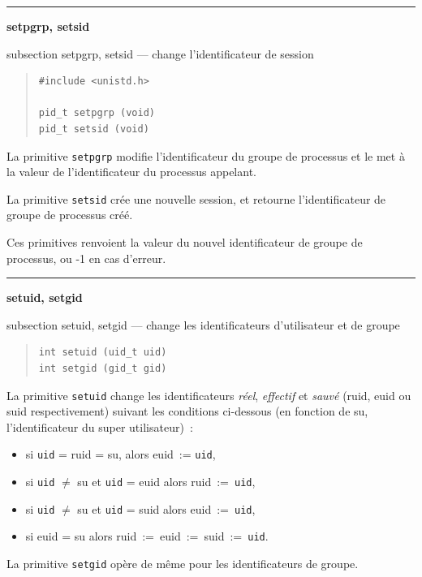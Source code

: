\documentclass [twoside] {report}
\newcommand {\primitive} [1]
    {
	\phantomsection
	{\large \textbf {#1}}
	\addcontentsline {toc} {subsection} {#1}
    }
\newcommand {\separation}
    {
	\vspace {5mm}
	\nopagebreak
	\hrule
    }
\begin{document}
\separation
\primitive {setpgrp, setsid} --- change l'identificateur de session

\begin {quote}
\begin {verbatim}
#include <unistd.h>

pid_t setpgrp (void)
pid_t setsid (void)
\end{verbatim}
\end {quote}

La primitive \texttt {setpgrp} modifie l'identificateur du groupe
de processus et le met à la valeur de l'identificateur du
processus appelant.

La primitive \texttt {setsid} crée une nouvelle session, et retourne
l'identificateur de groupe de processus créé.

Ces primitives renvoient la valeur du nouvel identificateur
de groupe de processus, ou -1 en cas d'erreur.




\separation
\primitive {setuid, setgid} --- change les identificateurs d'utilisateur et de groupe

\begin {quote}
\begin {verbatim}
int setuid (uid_t uid)
int setgid (gid_t gid)
\end{verbatim}
\end {quote}

La primitive \texttt {setuid} change les identificateurs
\textit {réel}, \textit {effectif} et \textit {sauvé} (ruid, euid ou
suid respectivement) suivant les conditions
ci-dessous (en fonction de su, l'identificateur du
super utilisateur)~:

\begin {itemize}
\item si \texttt {uid} = ruid = su, alors euid~:= \texttt {uid},
\item si \texttt {uid} {$\neq$} su et \texttt {uid} = euid alors ruid~:=~\texttt {uid},
\item si \texttt {uid} {$\neq$} su et \texttt {uid} = suid alors euid~:=~\texttt {uid},
\item si euid = su alors ruid~:=~euid~:=~suid~:=~\texttt {uid}.
\end {itemize}

La primitive \texttt {setgid} opère de même pour les
identificateurs de groupe.
\end{document}
